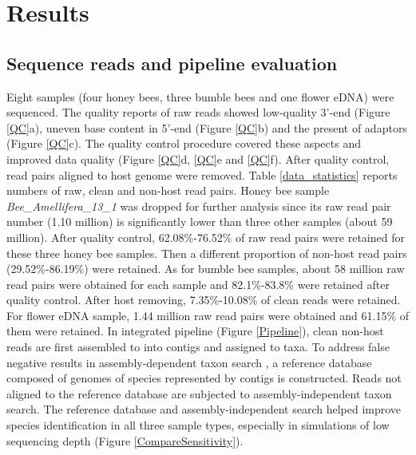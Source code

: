 \documentclass[11pt]{article}
\begin{document}
  \section{Results}

    \subsection{Sequence reads and pipeline evaluation}
    Eight samples (four honey bees, three bumble bees and one flower eDNA) were sequenced. 
    The quality reports of raw reads showed low-quality 3'-end (Figure \ref{QC}a), uneven base content in 5'-end (Figure \ref{QC}b) and the present of adaptors (Figure \ref{QC}c). 
    The quality control procedure covered these aspects and improved data quality (Figure \ref{QC}d, \ref{QC}e and \ref{QC}f).
    \newline
    After quality control, read pairs aligned to host genome were removed. 
    Table \ref{data_statistics} reports numbers of raw, clean and non-host read pairs. 
    Honey bee sample \textit{Bee\_Amellifera\_13\_1} was dropped for further analysis since its raw read pair number (1.10 million) is significantly lower than three other samples (about 59 million). 
    After quality control, 62.08\%-76.52\% of raw read pairs were retained for these three honey bee samples. 
    Then a different proportion of non-host read pairs (29.52\%-86.19\%) were retained. 
    As for bumble bee samples, about 58 million raw read pairs were obtained for each sample and 82.1\%-83.8\% were retained after quality control. 
    After host removing, 7.35\%-10.08\% of clean reads were retained.  
    For flower eDNA sample, 1.44 million raw read pairs were obtained and 61.15\% of them were retained. 
    \newline
    In integrated pipeline (Figure \ref{Pipeline}), clean non-host reads are first assembled to into contigs and assigned to taxa. 
    To address false negative results in assembly-dependent taxon search \citep{sharon2015accurate,vollmers2017comparing}, a reference database composed of genomes of species represented by contigs is constructed. 
    Reads not aligned to the reference database are subjected to assembly-independent taxon search. 
    The reference database and assembly-independent search helped improve species identification in all three sample types, especially in simulations of low sequencing depth (Figure \ref{CompareSensitivity}).
\end{document}
